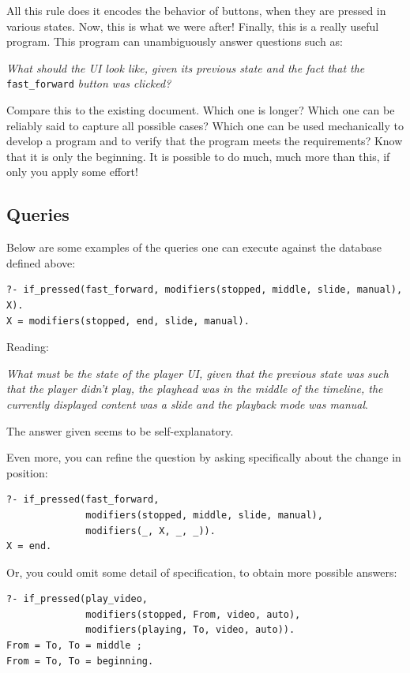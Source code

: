 \documentclass[11pt]{article}
\begin{document}
All this rule does it encodes the behavior of buttons, when they are pressed in
various states.  Now, this is what we were after!  Finally, this is a really
useful program.  This program can unambiguously answer questions such as:

\emph{What should the UI look like, given its previous state and the fact}
\emph{that the} \texttt{fast\_forward} \emph{button was clicked?}

Compare this to the existing document.  Which one is longer? Which one can be
reliably said to capture all possible cases?  Which one can be used mechanically
to develop a program and to verify that the program meets the requirements?
Know that it is only the beginning.  It is possible to do much, much more than
this, if only you apply some effort!
\subsection{Queries}
\label{sec-2-4}

Below are some examples of the queries one can execute against the database
defined above:

\begin{verbatim}
?- if_pressed(fast_forward, modifiers(stopped, middle, slide, manual), X).
X = modifiers(stopped, end, slide, manual).
\end{verbatim}

Reading:

\emph{What must be the state of the player UI, given that the previous state was}
\emph{such that the player didn't play, the playhead was in the middle of the}
\emph{timeline, the currently displayed content was a slide and the playback mode}
\emph{was manual}.

The answer given seems to be self-explanatory.

Even more, you can refine the question by asking specifically about the
change in position:

\begin{verbatim}
?- if_pressed(fast_forward,
              modifiers(stopped, middle, slide, manual),
              modifiers(_, X, _, _)).
X = end.
\end{verbatim}

Or, you could omit some detail of specification, to obtain more possible
answers:

\begin{verbatim}
?- if_pressed(play_video,
              modifiers(stopped, From, video, auto),
              modifiers(playing, To, video, auto)).
From = To, To = middle ;
From = To, To = beginning.
\end{verbatim}
\end{document}
